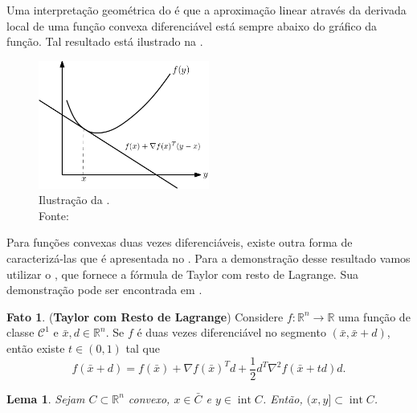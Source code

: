 \documentclass[12pt,a4paper]{scrartcl}
\DeclareMathOperator{\interior}{int}
\def\RR{\mathds{R}}
\def\xbar{\bar{x}}
\newtheorem{lema}{Lema}
\theoremstyle{definition}%
\newtheorem{fato}{Fato}
\begin{document}
Uma interpretação geométrica do  é que a aproximação linear através da derivada local de uma função convexa diferenciável está sempre abaixo do gráfico da função. Tal resultado está ilustrado na . 
\begin{figure}[!ht] 
	\centering
	\includegraphics[width=0.50\textwidth]{funcao_convexa_aproximacao_linear_derivada}
	\caption{Ilustração da . \label{fig:funcao_convexa_aproximacao_linear_derivada} \\ Fonte: \textcite{luenberger2008linear}}
\end{figure}

Para funções convexas duas vezes diferenciáveis, existe outra forma de caracterizá-las que é apresentada no . Para a demonstração desse resultado vamos utilizar o , que fornece a fórmula de Taylor com resto de Lagrange. Sua demonstração pode ser encontrada em \textcite[p.196]{Elon2019}.

\begin{fato}(\textbf{Taylor com Resto de Lagrange}) \label{fato:Taylor_com_resto_lagrange}
Considere $f: \RR^{n} \rightarrow \RR$ uma função de classe $\mathcal{C}^{1}$ e $\xbar, d \in \RR^{n}$. Se $f$ é duas vezes diferenciável no segmento $(\xbar , \xbar + d)$, então existe $t \in (0,1)$ tal que
\[{}
f(\xbar + d) = f(\xbar) + \nabla f(\xbar)^{T} d + \dfrac{1}{2}d^{T}\nabla^{2} f(\xbar + td)d .
\]
\end{fato}

\begin{lema} \label{lema:auxiliar_para_teo_hessiana_convexidade}
Sejam $C \subset \RR^{n}$ convexo, $x \in \bar{C}$ e $y \in \interior C$. Então, $(x,y] \subset \interior C$.
\end{lema}
\end{document}
